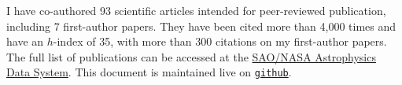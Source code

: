 I have co-authored 93 scientific articles intended for peer-reviewed 
publication, including 7 first-author papers. They have been cited more than 
4,000 times and have an $h$-index of 35, with more than 300 citations on my 
first-author papers. The full list of publications can be accessed at the 
\href{https://goo.gl/LAu9G4}{SAO/NASA Astrophysics Data System}.
%
This document is maintained live on
\href{https://github.com/cristobal-sifon/cv/blob/master/Sifon_publications.pdf}{\texttt{github}}.

